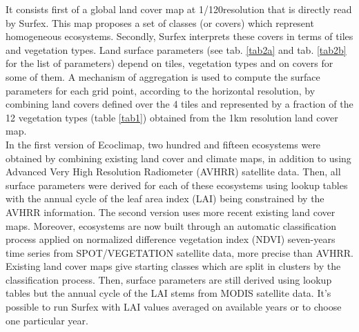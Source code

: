 It consists first of a global land cover map at 1/120\textdegree resolution that 
is directly read by Surfex. This map proposes a set of classes (or covers) which represent homogeneous ecosystems. 
Secondly, Surfex interprets these covers in terms of tiles and vegetation types. 
Land surface parameters (see tab. \ref{tab2a} and tab. \ref{tab2b} for the list of parameters) depend on tiles, vegetation types 
and on covers for some of them. A mechanism of aggregation 
is used to compute the surface parameters for each grid point, according to the horizontal resolution, by combining land covers defined over the 4 tiles and represented by a fraction of the 12 vegetation types (table \ref{tab1}) obtained from the 1km resolution land cover map. \\

In the first version of Ecoclimap, two hundred and fifteen ecosystems were obtained by combining existing land cover and 
climate maps, in addition to using Advanced Very High Resolution Radiometer (AVHRR) satellite data. Then, all surface parameters 
were derived for each of these ecosystems using lookup tables with the annual cycle of the leaf area index (LAI) being constrained by the AVHRR information. 
The second version uses more recent existing land cover maps. Moreover, ecosystems are now built through an automatic classification 
process applied on normalized difference vegetation index (NDVI) seven-years time series from SPOT/VEGETATION satellite data, more precise than AVHRR. Existing land cover maps give starting classes which are split in clusters by the classification process. 
Then, surface parameters are still derived using lookup tables but the annual cycle of the LAI stems from MODIS satellite data. It's possible 
to run Surfex with LAI values averaged on available years or to choose one particular year. 



